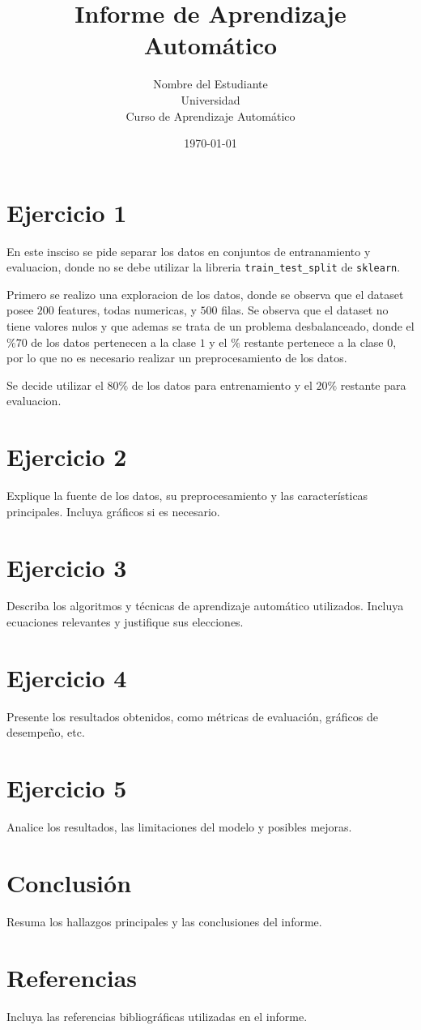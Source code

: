\documentclass[12pt,a4paper]{article}
\title{Informe de Aprendizaje Automático}
\author{Nombre del Estudiante \\ Universidad \\ Curso de Aprendizaje Automático}
\date{\today}
\begin{document}
\maketitle
\tableofcontents
\newpage

\section{Ejercicio 1}
En este insciso se pide separar los datos en conjuntos de entranamiento y evaluacion, donde no se debe utilizar la libreria \texttt{train\_test\_split} de \texttt{sklearn}.

Primero se realizo una exploracion de los datos, donde se observa que el dataset posee $200$ features, todas numericas, y $500$ filas.
 Se observa que el dataset no tiene valores nulos y que ademas se trata de un problema desbalanceado, donde el $\%70$ de los datos pertenecen a la clase $1$ 
 y el $\%$ restante pertenece a la clase $0$, por lo que no es necesario realizar un preprocesamiento de los datos. 
 
 Se decide utilizar el $80\%$ de los datos para entrenamiento 
 y el $20\%$ restante para evaluacion.
\section{Ejercicio 2}
Explique la fuente de los datos, su preprocesamiento y las características principales. Incluya gráficos si es necesario.

\section{Ejercicio 3}
Describa los algoritmos y técnicas de aprendizaje automático utilizados. Incluya ecuaciones relevantes y justifique sus elecciones.

\section{Ejercicio 4}
Presente los resultados obtenidos, como métricas de evaluación, gráficos de desempeño, etc.

\section{Ejercicio 5}
Analice los resultados, las limitaciones del modelo y posibles mejoras.

\section{Conclusión}
Resuma los hallazgos principales y las conclusiones del informe.

\section*{Referencias}
Incluya las referencias bibliográficas utilizadas en el informe.
\end{document}
